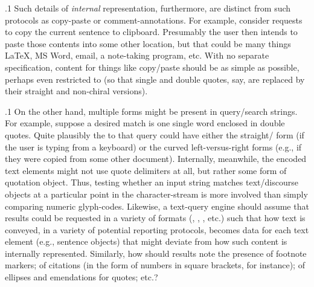 \documentclass[11pt, twocolumn]{article}
\begin{document}
\p.1{%
Such details of \textit{internal} representation, furthermore,
are distinct from such  protocols as copy-paste
or  comment-annotations. For example, consider requests
to copy the current sentence to clipboard. Presumably
the user then intends to paste those contents into some
other location, but that could be many things
\mdash{} \LaTeX{}, MS Word, email, a note-taking program, etc.
With no separate specification,  content
for things like copy/paste should be as simple as
possible, perhaps
even restricted to  (so
that  single and double quotes, say, are
replaced by their straight and non-chiral versions).
}%

\p.1{%
On the other hand, multiple forms might
be present in query/search strings. For example,
suppose a desired match is one single word enclosed
in double quotes. Quite plausibly the  to
that query could have either the straight/ form
(if the user is typing from a keyboard) or
the curved left-versus-right forms (e.g., if they were copied
from some other document). Internally, meanwhile,
the encoded text elements might not use quote delimiters at
all, but rather some form of quotation object.
Thus, testing whether an input string matches text/discourse
objects at a particular point in the character-stream
is more involved than simply comparing numeric glyph-codes.
Likewise, a text-query engine should assume that results
could be requested in a variety of formats (, ,
, etc.) such that how text is conveyed, in a variety of
potential reporting protocols, becomes data for each
text element (e.g., sentence objects) that might deviate
from how such content is internally represented. Similarly,
how should results note the presence of footnote markers;
of citations (in the form of numbers in square brackets, for instance);
of ellipses and emendations for quotes; etc.?
}%
\end{document}
